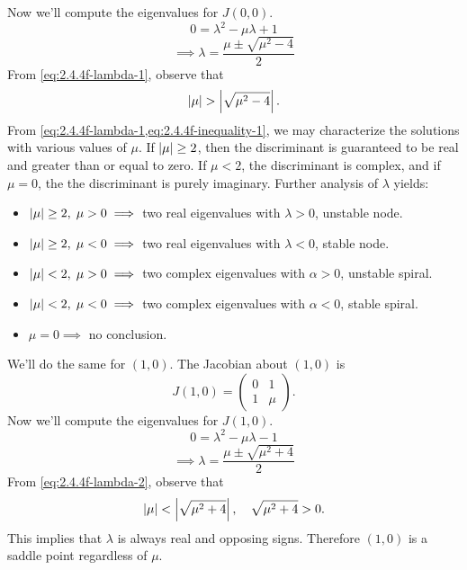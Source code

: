 \documentclass[12pt,twoside]{article}
\begin{document}
Now we'll compute the eigenvalues for $J(0,0)$.
\begin{equation*}
  0 = \lambda^2-\mu\lambda + 1
\end{equation*}
\begin{equation}
  \label{eq:2.4.4f-lambda-1}
  \implies\lambda = \frac{\mu \pm \sqrt{\mu^2-4}}{2}
\end{equation}
From \cref{eq:2.4.4f-lambda-1}, observe that
\begin{equation}
  \label{eq:2.4.4f-inequality-1}
  \abs{\mu}>\abs{\sqrt{\mu^2-4}}.
\end{equation}
From \cref{eq:2.4.4f-lambda-1,eq:2.4.4f-inequality-1}, we may characterize the
solutions with various values of $\mu$. If $\left|{\mu}\right|\ge2$, then the
discriminant is guaranteed to be real and greater than or equal to zero. If
$\mu<2$, the discriminant is complex, and if $\mu=0$, the the discriminant is
purely imaginary. Further analysis of $\lambda$ yields:
\begin{itemize}
\item $\left|{\mu}\right|\ge2,\;\mu>0 \implies$ two real eigenvalues with $\lambda>0$, unstable node.
\item $\left|{\mu}\right|\ge2,\;\mu<0 \implies$ two real eigenvalues with $\lambda<0$, stable node.
\item $\left|{\mu}\right|<2,\;\mu>0 \implies$ two complex eigenvalues with $\alpha>0$, unstable spiral.
\item $\left|{\mu}\right|<2,\;\mu<0 \implies$ two complex eigenvalues with $\alpha<0$, stable spiral.
\item $\mu=0 \implies$ no conclusion.
\end{itemize}
We'll do the same for $(1,0)$. The Jacobian about $(1,0)$ is
\begin{equation*}
  J(1,0) =
  \begin{pmatrix}
    0 & 1 \\ 1 & \mu
  \end{pmatrix}.
\end{equation*}
Now we'll compute the eigenvalues for $J(1,0)$.
\begin{equation*}
  0 = \lambda^2-\mu\lambda-1
\end{equation*}
\begin{equation}
  \label{eq:2.4.4f-lambda-2}
  \implies \lambda = \frac{\mu \pm \sqrt{\mu^2+4}}{2}
\end{equation}
From \cref{eq:2.4.4f-lambda-2}, observe that
\begin{equation}
  \label{eq:2.4.4f-inequality-2}
  \left|{\mu}\right|<\left|{\sqrt{\mu^2+4}}\right|,\quad \sqrt{\mu^2+4}>0.
\end{equation}
This implies that $\lambda$ is always real and opposing signs. Therefore $(1,0)$
is a saddle point regardless of $\mu$.
\end{document}
